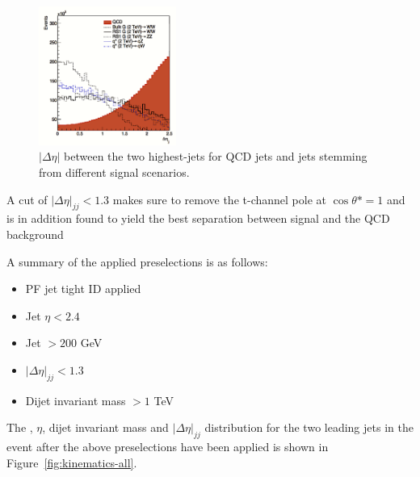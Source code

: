 \begin{figure}[h!]
\centering
\includegraphics[width=0.4\textwidth]{figures/analysis/search1/misc/deta_opt.png}
\caption{ $|\Delta\eta|$  between the two highest-\PT jets for QCD jets and jets stemming from different signal scenarios.}
\label{fig:searchI:detaopt}
\end{figure}
 
A cut of $|\Delta \eta|_{jj}<1.3$ makes sure to remove the t-channel pole at $\cos \theta* = 1$ and is in addition found to yield the best separation between signal and the QCD background

A summary of the applied preselections is as follows:

\begin{itemize}
\item PF jet tight ID applied
\item Jet $\eta < 2.4$
\item Jet \pt $> 200$ GeV
\item $|\Delta\eta|_{jj} < 1.3$
\item Dijet invariant mass $> 1$ TeV
\end{itemize} 

The \PT, $\eta$, dijet invariant mass and $|\Delta \eta|_{jj}$ distribution for the two leading jets in the event after the above preselections have been applied is shown in Figure~\ref{fig:kinematics-all}.


